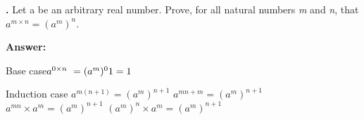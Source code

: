 \documentclass{article}
\newcounter{problem}
\begin{document}
 
\textbf{.} Let a be an arbitrary real number. Prove, for all natural numbers \textit{m} and \textit{n}, that \(a^{m \times n} = (a^m)^n\).

\textbf{Answer:}

Base case\newline \(a^{0 \times n}\ = (a^m)^0
\newline1 = 1\)

Induction case\newline
\(a^{m(n+1)} = (a^m)^{n+1}\) \newline
\(a^{mn + m} = (a^m)^{n+1}\) \newline
\(a^{mn} \times a^m = (a^m)^{n+1}\) \newline
\((a^m)^n \times a^m = (a^m)^{n+1}\)
\end{document}
